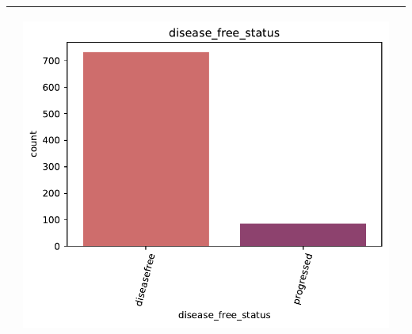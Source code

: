 \begin{table}[!htb]
\begin{threeparttable}
\begin{tabular}{p{2.5cm} p{7cm} p{6.5cm}}
			& \begin{center}\includegraphics[width=1\linewidth]{NOTEBOOK/IMAGENES_DESCRIPTIVAS/10_disease_free_status}\end{center}
			\\ \hline
			

\end{tabular}
\end{threeparttable}
\end{table}
